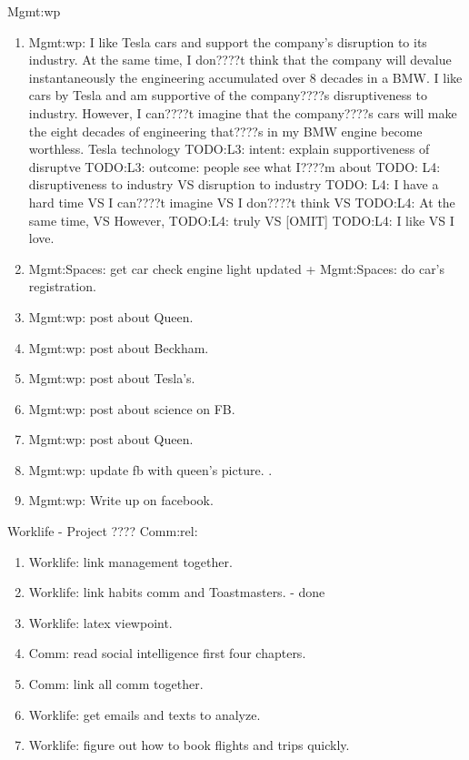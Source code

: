 {\begin{columns}
\begin{column}{0.5\columnwidth}
\begin{block}{Mgmt:wp}
\begin{enumerate}
\item \tiny Mgmt:wp: I like Tesla cars and support the company's
  disruption to its industry. At the same time, I don????t think
  that the company will devalue instantaneously the engineering
  accumulated over 8 decades in a BMW.
  {I like cars by Tesla and am supportive of the company????s
    disruptiveness to industry. However, I can????t imagine
    that the company????s cars will make the eight decades of
    engineering that????s in my BMW engine become worthless.
    Tesla technology
    TODO:L3: intent: explain supportiveness of disruptve
    TODO:L3: outcome: people see what I????m about 
    TODO: L4: disruptiveness to industry VS disruption to industry 
    TODO: L4: I have a hard time VS I can????t imagine VS I
    don????t think VS
    TODO:L4: At the same time, VS However, 
    TODO:L4: truly VS [OMIT] 
    TODO:L4: I like VS I love}. 
\item \tiny Mgmt:Spaces: get car check engine light updated
  + Mgmt:Spaces: do car's registration. 
\item \tiny Mgmt:wp: post about Queen.
\item \tiny Mgmt:wp: post about Beckham. 

\item \tiny Mgmt:wp: post about Tesla's. 
\item \tiny Mgmt:wp: post about science on FB. 
\item \tiny Mgmt:wp: post about Queen.
\item \tiny Mgmt:wp: update fb with queen's picture. . 
\item \tiny Mgmt:wp: Write up on facebook.  
\end{enumerate}           
\end{block} 

\begin{block}{Worklife - Project ???? Comm:rel:}
\begin{enumerate} 
  \tiny \item \tiny Worklife: link management together.  
\item \tiny Worklife: link habits comm and Toastmasters. - done
\item \tiny Worklife: latex viewpoint. 
\item \tiny Comm: read social intelligence first four chapters.
\item \tiny Comm: link all comm together.
\item \tiny Worklife: get emails and texts to analyze.
\item \tiny Worklife: figure out how to book flights and trips quickly. 
\end{enumerate}
\end{block} 


\end{column}
\end{columns}}
